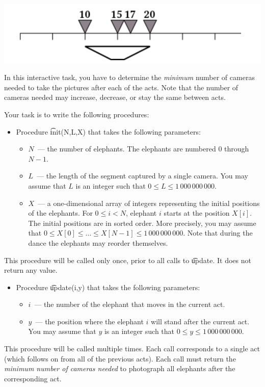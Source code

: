 \includegraphics[bb= 0 0 100 100]{elephants3.png}

In this interactive task, you have to determine the \textit{minimum} number of cameras needed to take
the pictures after each of the acts. Note that the number of cameras needed may increase, decrease, or stay the same between acts.

Your task is to write the following procedures:

\begin{itemize}
\item Procedure \t{init(N,L,X)} that takes the following parameters:

\begin{itemize}
\item $N$~--- the number of elephants. The elephants are numbered $0$ through $N-1$.
\item $L$~--- the length of the segment captured by a single camera. You may assume
that $L$ is an integer such that $0 \le L \le 1\,000\,000\,000$.
\item $X$~--- a one-dimensional array of integers representing the initial positions of the
elephants. For $0 \le i < N$, elephant $i$ starts at the position $X[i]$. The initial
positions are in sorted order. More precisely, you may assume that
$0 \le X[0] \le \dots \le X[N-1] \le 1\,000\,000\,000$. Note that during the dance the
elephants may reorder themselves.
\end{itemize}
\end{itemize}
This procedure will be called only once, prior to all calls to \t{update}. It does not return any
value.
\begin{itemize}
\item Procedure \t{update(i,y)} that takes the following parameters:
\begin{itemize}
\item $i$~--- the number of the elephant that moves in the current act.
\item $y$~--- the position where the elephant $i$ will stand after the current act. You may assume that $y$ is an integer such that $0 \le y \le 1\,000\,000\,000$.
\end{itemize}
\end{itemize}
This procedure will be called multiple times. Each call corresponds to a single act (which
follows on from all of the previous acts). Each call must return the \textit{minimum number of cameras needed} to photograph all elephants after the corresponding act.



